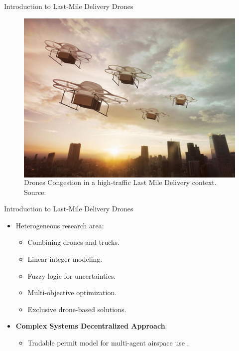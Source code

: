 \begin{frame}{Introduction to Last-Mile Delivery Drones}
    \begin{figure}
      \begin{columns}
        \caption{Drones Congestion in a high-traffic Last Mile Delivery context. \\ Source: \cite{imageDronesCongestion}}
        \label{fig:example left}
        \includegraphics[width=\textwidth]{img/Drone Congestion.jpg}
      \end{columns}
    \end{figure}

\end{frame}

\begin{frame}{Introduction to Last-Mile Delivery Drones}
\begin{itemize}
    \item Heterogeneous research area:
    \begin{itemize}
        \item Combining drones and trucks.
        \item Linear integer modeling.
        \item Fuzzy logic for uncertainties.
        \item Multi-objective optimization.
        \item Exclusive drone-based solutions.
    \end{itemize}
    \item \textbf{Complex Systems Decentralized Approach}:
    \begin{itemize}
        \item Tradable permit model for multi-agent airspace use \cite{Verri}.
    \end{itemize}
\end{itemize}

\end{frame}

